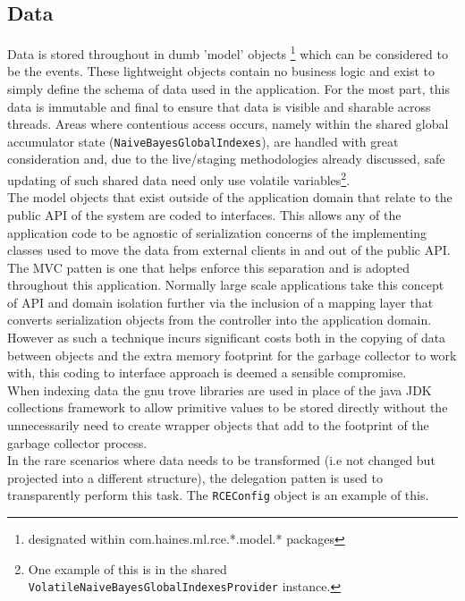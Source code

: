 \documentclass[a4paper,11pt]{scrreprt}
\begin{document}
\subsection{Data}
Data is stored throughout in dumb 'model' objects \footnote{designated within com.haines.ml.rce.*.model.* packages} which can be considered to be the events. These lightweight objects contain no business logic and exist to simply define the schema of data used in the application. For the most part, this data is immutable and final to ensure that data is visible and sharable across threads. Areas where contentious access occurs, namely within the shared global accumulator state (\verb|NaiveBayesGlobalIndexes|), are handled with great consideration and, due to the live/staging methodologies already discussed, safe updating of such shared data need only use volatile variables\footnote{One example of this is in the shared \verb|VolatileNaiveBayesGlobalIndexesProvider| instance.}.\\
The model objects that exist outside of the application domain that relate to the public API of the system are coded to interfaces. This allows any of the application code to be agnostic of serialization concerns of the implementing classes used to move the data from external clients in and out of the public API. The MVC patten is one that helps enforce this separation and is adopted throughout this application. Normally large scale applications take this concept of API and domain isolation further via the inclusion of a mapping layer that converts serialization objects from the controller into the application domain. However as such a technique incurs significant costs both in the copying of data between objects and the extra memory footprint for the garbage collector to work with, this coding to interface approach is deemed a sensible compromise. \\
When indexing data the gnu trove libraries are used in place of the java JDK collections framework to allow primitive values to be stored directly without the unnecessarily need to create wrapper objects that add to the footprint of the garbage collector process.\\
In the rare scenarios where data needs to be transformed (i.e not changed but projected into a different structure), the delegation patten\cite{design-patterns} is used to transparently perform this task. The \verb|RCEConfig| object is an example of this.
\end{document}
